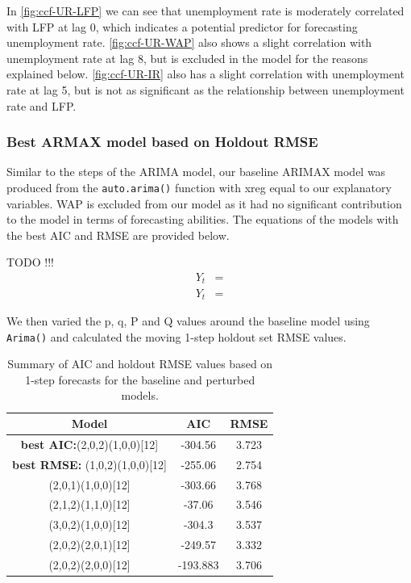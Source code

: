 \documentclass[]{article}
\begin{document}
In \cref{fig:ccf-UR-LFP} we can see that unemployment rate is moderately correlated with LFP at lag 0, which indicates a potential predictor for forecasting unemployment rate.  \cref{fig:ccf-UR-WAP} also shows a slight correlation with unemployment rate at lag 8, but is excluded in the model for the reasons explained below. \cref{fig:ccf-UR-IR} also has a slight correlation with unemployment rate at lag 5, but is not as significant as the relationship between unemployment rate and LFP. 






\subsubsection*{Best ARMAX model based on Holdout RMSE}
Similar to the steps of the ARIMA model, our baseline ARIMAX model was produced from the \texttt{auto.arima()} function with xreg equal to our explanatory variables. WAP is excluded from our model as it had no significant contribution to the model in terms of forecasting abilities. The equations of the models with the best AIC and RMSE are provided below.  

TODO !!!
\begin{align}
 Y_t &= \\
 Y_t &= 
\end{align}

We then varied the p, q, P and Q values around the baseline model using \texttt{Arima()} and calculated the moving 1-step holdout set RMSE values.

\begin{table}[H]
    \centering
    \captionsetup{justification=centering,margin=2cm}
    \begin{tabular}{|c|c|c|}
    \hline
     Model & AIC & RMSE\\
    \hline\hline
    \textbf{best AIC:}(2,0,2)(1,0,0){[}12{]} & -304.56  & 3.723 \\
    \textbf{best RMSE:}
    (1,0,2)(1,0,0){[}12{]}             & -255.06  & 2.754 \\
    \hline
    (2,0,1)(1,0,0){[}12{]}             & -303.66  & 3.768 \\
    (2,1,2)(1,1,0){[}12{]}             & -37.06   & 3.546 \\
    (3,0,2)(1,0,0){[}12{]}             & -304.3   & 3.537 \\
    (2,0,2)(2,0,1){[}12{]}             & -249.57  & 3.332 \\
    (2,0,2)(2,0,0){[}12{]}             & -193.883 & 3.706 \\
    \hline
    \end{tabular}
    \caption{Summary of AIC and holdout RMSE values based on\\ 1-step forecasts for the baseline and perturbed models.
    }
    \label{table:armax-model}
\end{table}
\end{document}
